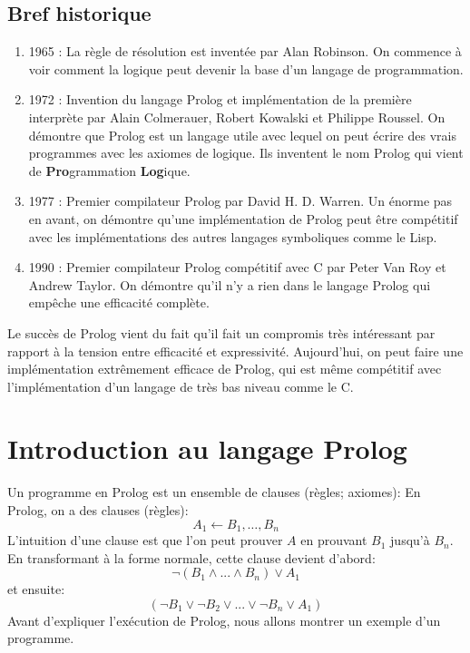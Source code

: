 \subsection{Bref historique}

\begin{enumerate}
	\item 1965 : 	La règle de résolution est inventée par Alan Robinson.
On commence à voir comment la logique peut devenir la base d'un langage de programmation.
	\item 1972 :	Invention du langage Prolog et implémentation de la première interprète
par Alain Colmerauer, Robert Kowalski et Philippe Roussel. 
On démontre que Prolog est un langage utile avec lequel on peut écrire des vrais programmes
avec les axiomes de logique.
Ils inventent le nom Prolog qui vient de {\bf Pro}grammation {\bf Log}ique.
        \item 1977 :    Premier compilateur Prolog par David H. D. Warren.
Un énorme pas en avant, on démontre qu'une implémentation de Prolog peut être compétitif
avec les implémentations des autres langages symboliques comme le Lisp.
        \item 1990 :    Premier compilateur Prolog compétitif avec C par Peter Van Roy et Andrew Taylor.
On démontre qu'il n'y a rien dans le langage Prolog qui empêche une efficacité complète.
\end{enumerate}
Le succès de Prolog vient du fait qu'il fait
un compromis très intéressant par rapport à la tension entre efficacité et expressivité.
Aujourd'hui, on peut faire une implémentation extrêmement efficace de Prolog, qui est même compétitif avec
l'implémentation d'un langage de très bas niveau comme le C.

\section{Introduction au langage Prolog}

Un programme en Prolog est un ensemble de clauses (règles; axiomes):
En Prolog, on a des clauses (règles):
	\begin{equation}
		 A_1 \leftarrow B_1, … , B_n
	\end{equation}
L'intuition d'une clause est que l'on peut prouver $A$ en prouvant $B_1$ jusqu'à $B_n$.
En transformant à la forme normale, cette clause devient d'abord:
	 \begin{equation}
	 	\neg (B_{1} \wedge ... \wedge B_{n}) \vee A_{1}
	 \end{equation}
et ensuite:
	 \begin{equation}
	 	 (\neg B_{1} \vee \neg B_{2} \vee ... \vee \neg B_{n} \vee A_{1})
	 \end{equation}
Avant d'expliquer l'exécution de Prolog, nous allons montrer un exemple d'un programme.


